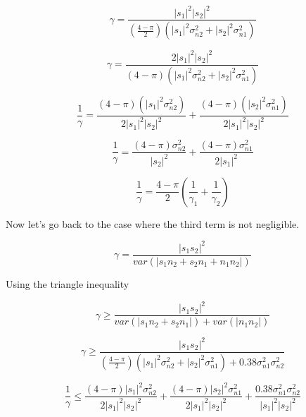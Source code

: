 \documentclass[11pt]{article}
\begin{document}
\begin{equation}
\gamma = \frac{|s_1|^2 |s_2|^2}{\left( \frac{4-\pi}{2}\right) \left( |s_1|^2 \sigma_{n2}^2 + |s_2|^2 \sigma_{n1}^2 \right)}
\end{equation}


\begin{equation}
\gamma = \frac{2|s_1|^2 |s_2|^2}{\left( 4-\pi \right) \left( |s_1|^2 \sigma_{n2}^2 + |s_2|^2 \sigma_{n1}^2 \right)}
\end{equation}


\begin{equation}
\frac{1}{\gamma}
=
\frac{(4-\pi)(|s_1|^2 \sigma_{n2}^2)}{2|s_1|^2 |s_2|^2}
+
\frac{(4-\pi)(|s_2|^2\sigma_{n1}^2)}{2|s_1|^2 |s_2|^2}
\end{equation}


\begin{equation}
\frac{1}{\gamma}
=
\frac{(4-\pi)\sigma_{n2}^2}{|s_2|^2}
+
\frac{(4-\pi)\sigma_{n1}^2}{2|s_1|^2}
\end{equation}

\begin{equation}
\boxed{
\frac{1}{\gamma}
=
\frac{4-\pi}{2}
\left(
\frac{1}{\gamma_1} + \frac{1}{\gamma_2}
\right)
}
\end{equation}


Now let's go back to the case where the third term is not negligible. 

\begin{equation}
\gamma = \frac{|s_1 s_2|^2}{var(|s_1 n_2 + s_2 n_1 + n_1 n_2|)}
\end{equation}

Using the triangle inequality

\begin{equation}
\gamma \geq \frac{|s_1 s_2|^2}{var(|s_1 n_2 + s_2 n_1|) + var(|n_1 n_2|)}
\end{equation}

\begin{equation}
\gamma \geq \frac{|s_1 s_2|^2}{
\left(
\frac{4-\pi}{2}
\right)
\left(
|s_1|^2 \sigma_{n2}^2 + |s_2|^2 \sigma_{n1}^2
\right)
 +
0.38 \sigma_{n1}^2 \sigma_{n2}^2}
\end{equation}


\begin{equation}
\frac{1}{\gamma}
\leq
\frac{\left( 4-\pi \right) |s_1|^2 \sigma_{n2}^2}
{2|s_1|^2|s_2|^2}
+
\frac{\left( 4-\pi \right) |s_2|^2 \sigma_{n1}^2}
{2|s_1|^2|s_2|^2}
+
\frac{0.38\sigma_{n1}^2 \sigma_{n2}^2}
{|s_1|^2|s_2|^2}
\end{equation}
\end{document}
